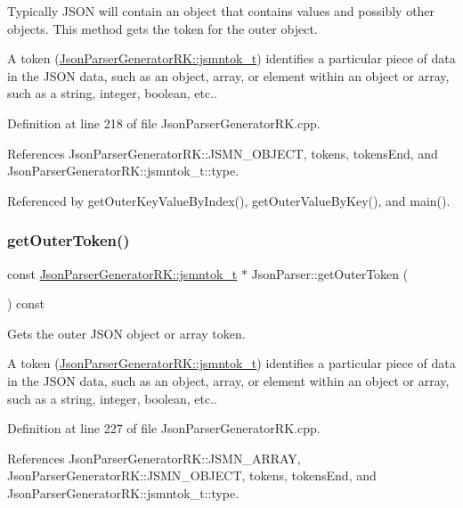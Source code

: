 Typically J\+S\+ON will contain an object that contains values and possibly other objects. This method gets the token for the outer object.

A token (\hyperlink{struct_json_parser_generator_r_k_1_1jsmntok__t}{Json\+Parser\+Generator\+R\+K\+::jsmntok\+\_\+t}) identifies a particular piece of data in the J\+S\+ON data, such as an object, array, or element within an object or array, such as a string, integer, boolean, etc.. 

Definition at line 218 of file Json\+Parser\+Generator\+R\+K.\+cpp.



References Json\+Parser\+Generator\+R\+K\+::\+J\+S\+M\+N\+\_\+\+O\+B\+J\+E\+CT, tokens, tokens\+End, and Json\+Parser\+Generator\+R\+K\+::jsmntok\+\_\+t\+::type.



Referenced by get\+Outer\+Key\+Value\+By\+Index(), get\+Outer\+Value\+By\+Key(), and main().

\mbox{\label{class_json_parser_a3c28b01c0e1fc3c7677e07e1739ea288}} 
\subsubsection{\texorpdfstring{get\+Outer\+Token()}{getOuterToken()}}
{\footnotesize\ttfamily const \hyperlink{struct_json_parser_generator_r_k_1_1jsmntok__t}{Json\+Parser\+Generator\+R\+K\+::jsmntok\+\_\+t} $\ast$ Json\+Parser\+::get\+Outer\+Token (\begin{DoxyParamCaption}{ }\end{DoxyParamCaption}) const}



Gets the outer J\+S\+ON object or array token. 

A token (\hyperlink{struct_json_parser_generator_r_k_1_1jsmntok__t}{Json\+Parser\+Generator\+R\+K\+::jsmntok\+\_\+t}) identifies a particular piece of data in the J\+S\+ON data, such as an object, array, or element within an object or array, such as a string, integer, boolean, etc.. 

Definition at line 227 of file Json\+Parser\+Generator\+R\+K.\+cpp.



References Json\+Parser\+Generator\+R\+K\+::\+J\+S\+M\+N\+\_\+\+A\+R\+R\+AY, Json\+Parser\+Generator\+R\+K\+::\+J\+S\+M\+N\+\_\+\+O\+B\+J\+E\+CT, tokens, tokens\+End, and Json\+Parser\+Generator\+R\+K\+::jsmntok\+\_\+t\+::type.



